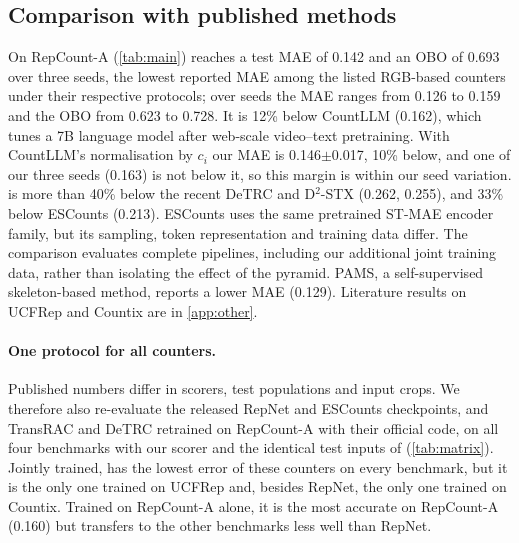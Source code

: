 \subsection{Comparison with published methods}
On RepCount-A (\cref{tab:main}) \method reaches a test MAE of 0.142 and an OBO of
0.693 over three seeds, the lowest reported MAE among the listed RGB-based
counters under their respective protocols; over seeds the MAE ranges from 0.126
to 0.159 and the OBO from 0.623 to 0.728. It is 12\% below
CountLLM (0.162), which tunes a 7B language model after web-scale video--text
pretraining. With CountLLM's normalisation by $c_i$ our MAE is
0.146$\pm$0.017, 10\% below, and one of our three seeds (0.163) is not below it,
so this margin is within our seed variation. \method is more than 40\% below
the recent DeTRC and D$^2$-STX (0.262, 0.255),
and 33\% below ESCounts (0.213). ESCounts uses the same pretrained ST-MAE encoder
family, but its sampling, token representation and training data differ.
The comparison evaluates complete pipelines, including our additional joint
training data, rather than isolating the effect of the pyramid.
PAMS, a self-supervised skeleton-based method, reports a lower MAE
(0.129). Literature results on UCFRep and Countix are in \cref{app:other}.

\paragraph{One protocol for all counters.}
Published numbers differ in scorers, test populations and input crops. We
therefore also re-evaluate the released RepNet and ESCounts checkpoints, and
TransRAC and DeTRC retrained on RepCount-A with their official code, on all four
benchmarks with our scorer and the identical test inputs of \method
(\cref{tab:matrix}). Jointly trained, \method has the lowest error of these
counters on every benchmark, but it is the only one trained on UCFRep and,
besides RepNet, the only one trained on Countix. Trained on RepCount-A alone, it
is the most accurate on RepCount-A (0.160) but transfers to the other benchmarks
less well than RepNet.

